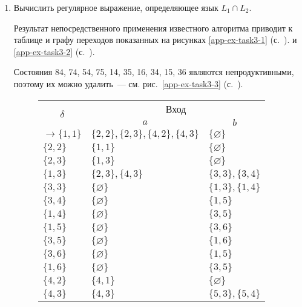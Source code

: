 		
\begin{enumerate}[label=(\roman{*})]
	\item Вычислить регулярное выражение, определяющее язык $L_1 \cap  L_2$. 
    
    Результат непосредственного применения известного алгоритма
    приводит к таблице и графу переходов показанных на рисунках
    \ref{app-ex-task3-1} (с.~\pageref{app-ex-task3-1}). и \ref{app-ex-task3-2} (с.~\pageref{app-ex-task3-2}).

	Состояния 84, 74, 54, 75, 14, 35, 16, 34, 15, 36 являются непродуктивными, поэтому их можно удалить~--- см. рис.~\ref{app-ex-task3-3} (с.~\pageref{app-ex-task3-3}).

\afterpage{%
   \clearpage %
}
   \begin{figure}[ht!]  %
\centering
		\begin{tabular}{lll}
			\toprule
			\multicolumn{1}{c}{\multirow{2}{*}{\Large $\delta$}}
			& \multicolumn{2}{c}{Вход} \\
			\cmidrule(rl){2-3}
			& \multicolumn{1}{c}{$a$}
			& \multicolumn{1}{c}{$b$}  \\
			\midrule
			$\to \{1, 1\}$       & $\{2, 2\}, \{2, 3\}, \{4, 2\}, \{4, 3\}$     		 & $\{\varnothing\}$      \\
			$\{2, 2\}$       & $\{1, 1\}$    			 & $\{\varnothing\}$      \\
			$\{2, 3\}$       & $\{1, 3\}$    			 & $\{\varnothing\}$      \\
			$\{1, 3\}$       & $\{2, 3\}, \{4, 3\}$     &  $\{3, 3\}, \{3, 4\}$  \\
			$\{3, 3\}$       & $\{\varnothing\}$     &  $\{1, 3\}, \{1, 4\}$  \\
			$\{3, 4\}$       & $\{\varnothing\}$     &  $\{1, 5\}$  \\
			$\{1, 4\}$       & $\{\varnothing\}$     &  $\{3, 5\}$  \\
			$\{1, 5\}$       & $\{\varnothing\}$     &  $\{3, 6\}$  \\
			$\{3, 5\}$       & $\{\varnothing\}$     &  $\{1, 6\}$  \\
			$\{3, 6\}$       & $\{\varnothing\}$     &  $\{1, 5\}$  \\
			$\{1, 6\}$       & $\{\varnothing\}$     &  $\{3, 5\}$  \\
			$\{4, 2\}$       & $\{4, 1\}$    			 & $\{\varnothing\}$      \\
			$\{4, 3\}$       & $\{4, 3\}$    			 & $\{5, 3\}, \{5, 4\}$      \\

\end{tabular}
\end{figure}
\end{enumerate}
